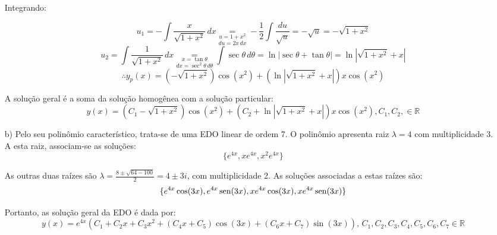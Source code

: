 \documentclass[12pt,a4paper]{article}
\newcommand{\re}{\mathbb{R}}
\newcommand{\sen}{\mbox{\,sen}}
\begin{document}
\begin{itemize}
Integrando:

$$ u_1 = -\int \frac{x}{\sqrt{1+x^2}} \, dx \underset{du = 2x\,dx}{\underset{u = 1+x^2}{=}} - \frac{1}{2} \int \frac{du}{\sqrt{u}} = - \sqrt{u} = -\sqrt{1+x^2}  $$
$$ u_2 = \int \frac{1}{\sqrt{1+x^2}} \, dx \underset{dx = \sec^2 \theta \, d\theta}{\underset{x = \tan\theta}{=}} \int \sec\theta \, d\theta = \ln|\sec\theta + \tan\theta| = \ln|\sqrt{1+x^2} + x| $$
$$ \therefore y_p(x) = ( -\sqrt{1+x^2} )\cos(x^2) + (\ln|\sqrt{1+x^2} + x|)x\cos(x^2) $$

A solução geral é a soma da solução homogênea com a solução particular:
$$ y(x) = ( C_1   -\sqrt{1+x^2} ) \cos(x^2) + (C_2  + \ln|\sqrt{1+x^2} + x|)x\cos(x^2)  , C_1, C_2, \in \re $$

\item[b)] Pelo seu polinômio característico, trata-se de uma EDO linear de ordem 7. O polinômio apresenta raiz $\lambda = 4$ com multiplicidade 3. A esta raiz, associam-se as soluções:
$$\{ e^{4x}, x e^{4x}, x^2 e^{4x} \}$$

As outras duas raízes são $\lambda = \frac{8 \pm \sqrt{64-100}}{2} = 4 \pm 3i$, com multiplicidade 2. As soluções associadas a estas raízes são:
$$\{e^{4x}\cos(3x),e^{4x}\sen(3x),x e^{4x}\cos(3x),x e^{4x}\sen(3x) \} $$

Portanto, as solução geral da EDO é dada por:
$$ y(x) = e^{4x} (C_1 + C_2 x + C_3 x^2 + (C_4 x + C_5)\cos(3x) + (C_6 x + C_7)\sin(3x) ) , \, C_1, C_2, C_3, C_4, C_5, C_6, C_7 \in \re $$

\end{itemize}
\end{document}
